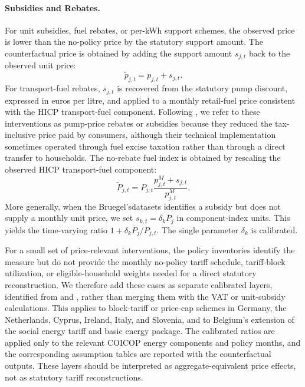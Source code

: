 \documentclass[11pt]{article}
\begin{document}
\paragraph{Subsidies and Rebates.}
For unit subsidies, fuel rebates, or per-kWh support schemes, the observed price is lower than the
no-policy price by the statutory support amount. The counterfactual price is obtained by adding the
support amount $s_{j,t}$ back to the observed unit price:
\begin{equation}
\widetilde p_{j,t}
=
p_{j,t}+s_{j,t}.
\end{equation}
For transport-fuel rebates, $s_{j,t}$ is recovered from the statutory pump discount, expressed in
euros per litre, and applied to a monthly retail-fuel price consistent with the HICP transport-fuel
component. Following \citet{bonnet2025compensating}, we refer to these interventions as pump-price
rebates or subsidies because they reduced the tax-inclusive price paid by consumers, although their
technical implementation sometimes operated through fuel excise taxation rather than through a
direct transfer to households. The no-rebate fuel index is obtained by rescaling the observed HICP
transport-fuel component:
\[
\widetilde P_{j,t}
= P_{j,t}
\frac{p^{M}_{j,t}+s_{j,t}}{p^{M}_{j,t}} .
\]
More generally, when the Bruegel'sdatasets identifies a subsidy but does not supply a monthly unit
price, we set $s_{k,t}=\delta_k\bar P_j$ in component-index units. This yields the time-varying ratio
$1+\delta_k\bar P_j/P_{j,t}$. The single parameter $\delta_k$ is calibrated.


For a small set of price-relevant interventions, the policy inventories identify the measure but do
not provide the monthly no-policy tariff schedule, tariff-block utilization, or eligible-household
weights needed for a direct statutory reconstruction. We therefore add these cases as separate
calibrated layers, identified from \citet{sgaravatti2021national} and \citet{arregui2022targeted},
rather than merging them with the VAT or unit-subsidy calculations. This applies to block-tariff or
price-cap schemes in Germany, the Netherlands, Cyprus, Ireland, Italy, and Slovenia, and to
Belgium's extension of the social energy tariff and basic energy package. The calibrated ratios are
applied only to the relevant COICOP energy components and policy months, and the corresponding
assumption tables are reported with the counterfactual outputs. These layers should be interpreted
as aggregate-equivalent price effects, not as statutory tariff reconstructions.
\end{document}
